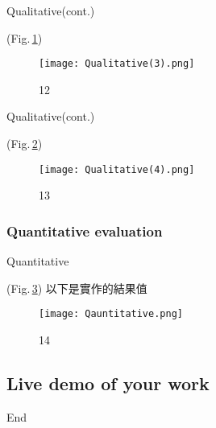 \documentclass{beamer}
\begin{document}
\begin{frame}{Qualitative(cont.)}
\begin{CJK}{UTF8}{bkai}
(Fig.\,\ref{fig:12})
 \end{CJK}
 \begin{figure}
    \texttt{[image: Qualitative(3).png]}
    \caption{12}
    \label{fig:12}
  \end{figure}
\end{frame}


\begin{frame}{Qualitative(cont.)}
\begin{CJK}{UTF8}{bkai}
(Fig.\,\ref{fig:13})
 \end{CJK}
 \begin{figure}
    \texttt{[image: Qualitative(4).png]}
    \caption{13}
    \label{fig:13}
  \end{figure}
\end{frame}

\subsubsection{Quantitative evaluation}
\begin{frame}{Quantitative}

\begin{CJK}{UTF8}{bkai}
(Fig.\,\ref{fig:14})  
以下是實作的結果值
 \end{CJK}
 \begin{figure}
    \texttt{[image: Qauntitative.png]}
    \caption{14}
    \label{fig:14}
  \end{figure}


\end{frame}

\subsection{Live demo of your work}

\begin{frame}
\center \huge End
\end{frame}
\end{document}
